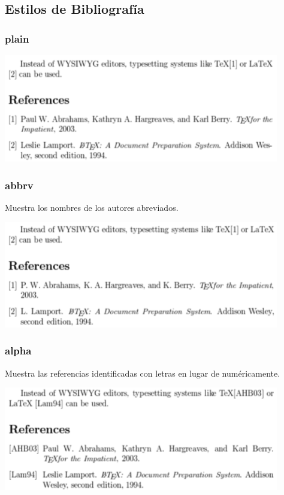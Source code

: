 \documentclass[aspectratio=43]{beamer}%
\begin{document}
\subsection{Estilos de Bibliografía}
\begin{frame}[fragile]
\frametitle{\textbf{plain}}
\justifying
 \begin{center}
\includegraphics[width=12cm]{images/plain}
\end{center}

\end{frame}

 \begin{frame}[fragile]
\frametitle{\textbf{abbrv}}
\justifying
 Muestra los nombres de los autores abreviados.
 
 \begin{center}
\includegraphics[width=12cm]{images/abbrv}
\end{center}

\end{frame}



\begin{frame}[fragile]
\frametitle{\textbf{alpha}}
\justifying
 Muestra las referencias identificadas con letras en lugar de numéricamente.
 
 \begin{center}
\includegraphics[width=12cm]{images/alpha}
\end{center}

\end{frame}
\end{document}
